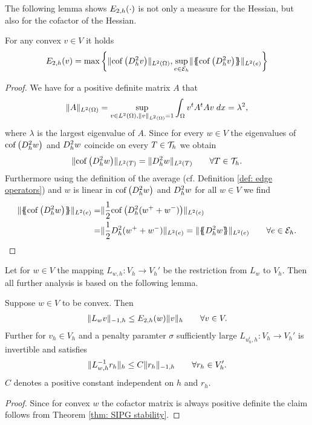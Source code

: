 The following lemma shows $E_{2,h}(\cdot)$ is not only a measure for the Hessian, but also for the cofactor of the Hessian.
\begin{lemma} \label{la: epsilon cof hess equal}
	For any convex $v \in V$ it holds
	\[
		E_{2,h}(v) = \operatorname{max} \left\{  \lVert \operatorname{cof} \left( D_h^2 v \right) \rVert_{L^2(\Omega)},  \sup_{e \in \mathcal{E}_h} \lVert \{\!\!\{ \operatorname{cof} \left( D_h^2 v \right) \}\!\!\} \rVert_{L^2(e)} \right\} 
	\]
\end{lemma}
\begin{proof}
	We have for a positive definite matrix $A$ that 
	\begin{align*}
	\lVert A \rVert_{L^2(\Omega)} =  \sup_{v \in L^2(\Omega), \lVert v \rVert_{L^2(\Omega)}=1} \int_{\Omega} {{v^t A^t A v}\;dx} = \lambda^2,
	\end{align*}
	where $\lambda$ is the largest eigenvalue of $A$. Since for every $w \in V$ the eigenvalues of $\operatorname{cof} \left( D_h^2 w \right)$ and $D_h^2 w$ coincide on every $T \in \mathcal{T}_h$ we obtain 
	\begin{align}
	\lVert \operatorname{cof} \left( D_h^2 w \right) \rVert_{L^2(T)} = \lVert D_h^2 w \rVert_{L^2(T)} \qquad \forall T \in \mathcal{T}_h.\label{eq: equality norm}
	\end{align}
	Furthermore using the definition of the average (cf. Definition \ref{def: edge operators}) and $w$ is linear in $\operatorname{cof} \left( D_h^2 w \right)$ and $D_h^2 w$ for all $w \in V$ we find
	\begin{align}
	\LTwonormE{\average {\cofHessH{w}}} 
	=& \LTwonormE{\frac 1 2 {\cofHessH{(w^+ + w^-)}}} \nonumber\\
	=& \LTwonormE{\frac 1 2 {\hess{(w^+ + w^-)}}} 
	= \LTwonormE{\average {\hess{w}}} \qquad \forall e \in \edges. \label{eq: equality norm average}
	\end{align}
	\phantom{blub}
\end{proof}

Let for $w \in V$ the mapping $L_{w,h}:V_h \rightarrow V_h'$ be the restriction from $L_w$ to $V_h$. Then all further analysis is based on the following lemma.
\begin{lemma}[Stability] \label{la: stability L}
	Suppose $w \in V$ to be convex. Then 
	\begin{align}
		\lVert L_{w}v \rVert_{-1,h} \leq E_{2,h}(w) \lVert v \rVert_{h} \qquad \forall v \in V.
	\end{align}
	Further for $v_h \in V_h$ and a penalty paramter $\sigma $ sufficiently large $L_{u^i_h,h}: V_h \rightarrow V_h'$ is invertible and satisfies
	\begin{align}
		\lVert L_{w,h}^{-1} r_h \rVert_{h} \leq C \lVert r_h \rVert_{-1,h} \qquad \forall r_h \in V_h'.
	\end{align}
	$C$ denotes a positive constant independent on $h$ and $r_h$. 
\end{lemma}
\begin{proof}
	Since for convex $w$ the cofactor matrix is always positive definite the claim follows from Theorem \ref{thm: SIPG stability}.
\end{proof}

